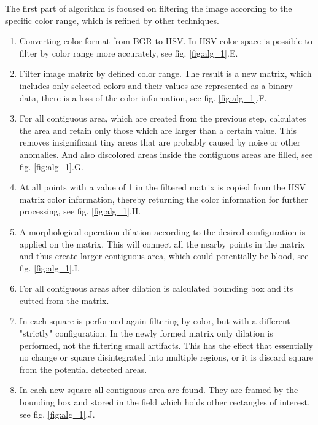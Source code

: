 \documentclass[twoside]{article}
\begin{document}
\begin{multicols}{2}
The first part of algorithm is focused on filtering the image according to the specific color range, which is refined by other techniques.
\begin{enumerate}
	\item Converting color format from BGR to HSV. In HSV color space is possible to filter by color range more accurately, see fig. \ref{fig:alg_1}.E.
	\item Filter image matrix by defined color range. The result is a new matrix, which includes only selected colors and their values are represented as a binary data, there is a loss of the color information, see fig. \ref{fig:alg_1}.F.
	\item For all contiguous area, which are created from the previous step, calculates the area and retain only those which are larger than a certain value. This removes insignificant tiny areas that are probably caused by noise or other anomalies. And also discolored areas inside the contiguous areas are filled, see fig. \ref{fig:alg_1}.G.
	\item At all points with a value of 1 in the filtered matrix is copied from the HSV matrix color information, thereby returning the color information for further processing, see fig. \ref{fig:alg_1}.H.
	\item A morphological operation dilation according to the desired configuration is applied on the matrix. This will connect all the nearby points in the matrix and thus create larger contiguous area, which could potentially be blood, see fig. \ref{fig:alg_1}.I.
	\item For all contiguous areas after dilation is calculated bounding box and its cutted from the matrix.
	\item In each square is performed again filtering by color, but with a different "strictly" configuration. In the newly formed matrix only dilation is performed, not the filtering small artifacts. This has the effect that essentially no change or square disintegrated into multiple regions, or it is discard square from the potential detected areas.
	\item In each new square all contiguous area are found. They are framed by the bounding box and stored in the field which holds other rectangles of interest, see fig. \ref{fig:alg_1}.J.
\end{enumerate}


\end{multicols}
\end{document}
